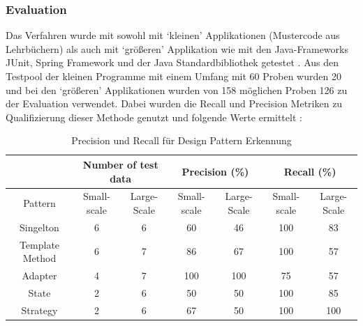 \documentclass[conference]{IEEEtran}
\begin{document}
\subsubsection*{Evaluation}

Das Verfahren wurde mit sowohl mit `kleinen' Applikationen (Mustercode aus Lehrbüchern) als auch mit `größeren' Applikation wie mit den Java-Frameworks JUnit, Spring Framework und der Java Standardbibliothek getestet \cite[p. 7]{dodmetrics}.
Aus den Testpool der kleinen Programme mit einem Umfang mit 60 Proben wurden 20 und bei den `größeren' Applikationen wurden von 158 möglichen Proben 126 zu der Evaluation verwendet.
Dabei wurden die Recall und Precision Metriken zu Qualifizierung dieser Methode genutzt und folgende Werte ermittelt \cite[p. 8]{dodmetrics}:

\begin{table}
    \centering
    \caption{Precision und Recall für Design Pattern Erkennung}
    \label{table:2}
    \begin{tabular}{|c|c|c|c|c|c|c|}
        \hline
                        & \multicolumn{2}{|c|}{Number of test data} & \multicolumn{2}{|c|}{Precision (\%)} & \multicolumn{2}{|c|}{Recall (\%)}                                           \\
        \hline
        Pattern         & Small-scale                               & Large-Scale                          & Small-scale                       & Large-Scale & Small-scale & Large-Scale \\
        \hline
        Singelton       & 6                                         & 6                                    & 60                                & 46          & 100         & 83          \\
        \hline
        Template Method & 6                                         & 7                                    & 86                                & 67          & 100         & 57          \\
        \hline
        Adapter         & 4                                         & 7                                    & 100                               & 100         & 75          & 57          \\
        \hline
        State           & 2                                         & 6                                    & 50                                & 50          & 100         & 85          \\
        \hline
        Strategy        & 2                                         & 6                                    & 67                                & 50          & 100         & 100         \\
        \hline
    \end{tabular}
\end{table}
\end{document}
